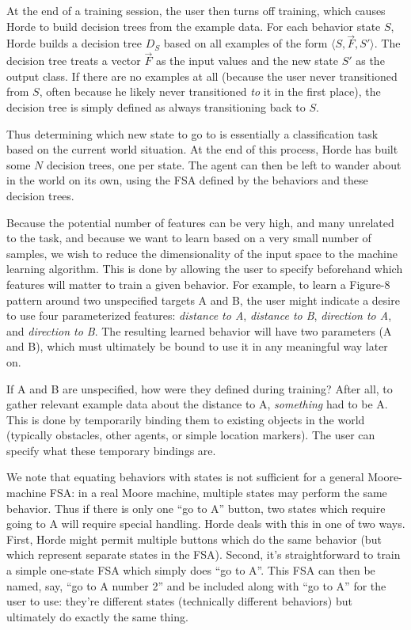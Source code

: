 \documentclass[11pt]{article}
\begin{document}
At the end of a training session, the user then turns off training, which causes Horde to build decision trees from the example data.  For each behavior state \(S\), Horde builds a decision tree \(D_S\) based on all examples of the form \(\langle S, \vec{F}, S'\rangle\).  The decision tree treats a vector \(\vec{F}\) as the input values and the new state \(S'\) as the output class.  If there are no examples at all (because the user never transitioned from \(S\), often because he likely never transitioned {\it to} it in the first place), the decision tree is simply defined as always transitioning back to \(S\).

Thus determining which new state to go to is essentially a classification task based on the current world situation.  At the end of this process, Horde has built some \(N\) decision trees, one per state.  The agent can then be left to wander about in the world on its own, using the FSA defined by the behaviors and these decision trees.

Because the potential number of features can be very high, and many unrelated to the task, and because we want to learn based on a very small number of samples, we wish to reduce the dimensionality of the input space to the machine learning algorithm.  This is done by allowing the user to specify beforehand which features will matter to train a given behavior.  For example, to learn a Figure-8 pattern around two unspecified targets A and B, the user might indicate a desire to use four parameterized features: {\it distance to A}, {\it distance to B}, {\it direction to A}, and {\it direction to B}.  The resulting learned behavior will have two parameters (A and B), which must ultimately be bound to use it in any meaningful way later on.

If A and B are unspecified, how were they defined during training?  After all, to gather relevant example data about the distance to A, {\it something} had to be A.   This is done by temporarily binding them to existing objects in the world (typically obstacles, other agents, or simple location markers).  The user can specify what these temporary bindings are.

We note that equating behaviors with states is not sufficient for a general Moore-machine FSA: in a real Moore machine, multiple states may perform the same behavior.  Thus if there is only one ``go to A'' button, two states which require going to A will require special handling.  Horde deals with this in one of two ways.  First, Horde might permit multiple buttons which do the same behavior (but which represent separate states in the FSA).  Second, it's straightforward to train a simple one-state FSA which simply does ``go to A''.  This FSA can then be named, say, ``go to A number 2'' and be included along with ``go to A'' for the user to use: they're different states (technically different behaviors) but ultimately do exactly the same thing.
\end{document}
